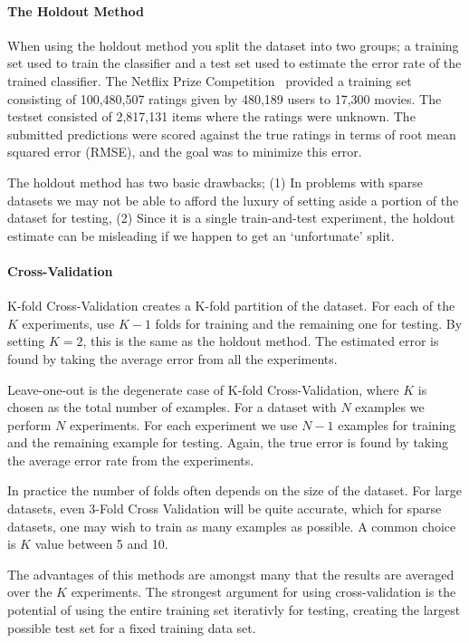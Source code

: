 \paragraph{The Holdout Method}
When using the holdout method you split the dataset into two groups; a training
set used to train the classifier and a test set used to estimate the error rate
of the trained classifier. The Netflix Prize Competition~\cite{Netflix}
provided a training set consisting of 100,480,507 ratings given by 480,189
users to 17,300 movies. The testset consisted of 2,817,131 items where the
ratings were unknown. The submitted predictions were scored against the true
ratings in terms of root mean squared error (RMSE), and the goal was to
minimize this error.

The holdout method has two basic drawbacks; (1) In problems with sparse
datasets we may not be able to afford the luxury of setting aside a portion of
the dataset for testing, (2) Since it is a single train-and-test experiment,
the holdout estimate can be misleading if we happen to get an `unfortunate'
split.

\paragraph{Cross-Validation}
K-fold Cross-Validation creates a K-fold partition of the dataset. For each of
the $K$ experiments, use $K-1$ folds for training and the remaining one for
testing. By setting $K=2$, this is the same as the holdout method. The estimated
error is found by taking the average error from all the experiments.

Leave-one-out is the degenerate case of K-fold Cross-Validation, where $K$ is
chosen as the total number of examples. For a dataset with $N$ examples we
perform $N$ experiments. For each experiment we use $N-1$ examples for training
and the remaining example for testing. Again, the true error is found by taking
the average error rate from the experiments.

In practice the number of folds often depends on the size of the dataset. For
large datasets, even 3-Fold Cross Validation will be quite accurate, which for
sparse datasets, one may wish to train as many examples as possible. A common
choice is $K$ value between 5 and 10.

The advantages of this methods are amongst many that the results are averaged
over the $K$ experiments. The strongest argument for using cross-validation is
the potential of using the entire training set iterativly for testing, creating
the largest possible test set for a fixed training data set.

